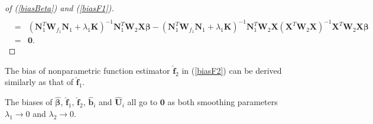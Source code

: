 \documentclass[article,lineno]{biometrika}
\begin{document}
\begin{proof} [of (\ref{biasBeta}) and (\ref{biasF1})]
\begin{eqnarray*}
  \\
  &=&
(\boldsymbol N_1^T \boldsymbol W_{f_1}  \boldsymbol N_1
  + \lambda_1 \boldsymbol K)^{-1}  \boldsymbol N_1^T
\boldsymbol W_2
\boldsymbol X \boldsymbol \beta 
 -   (\boldsymbol N_1^T \boldsymbol W_{f_1}  \boldsymbol N_1
  + \lambda_1 \boldsymbol K)^{-1}  \boldsymbol N_1^T
\boldsymbol W_2 \boldsymbol X
(\boldsymbol X^T  \boldsymbol W_2\boldsymbol X)^{-1}  
\boldsymbol X^T  \boldsymbol W_2 \boldsymbol X
\boldsymbol \beta  \\
  &=&   \boldsymbol 0.
\end{eqnarray*}
\end{proof}
\begin{remark}
The bias of nonparametric function estimator $\bm {\hat f}_2$ in (\ref{biasF2}) can be derived similarly as that of $\bm {\hat f}_1$.
\end{remark}


%
%
\begin{lemma}
The biases of $\boldsymbol {\hat \beta}$, $\boldsymbol {\hat f}_1$, $\boldsymbol {\hat f}_2$, $\boldsymbol {\hat b}_i$ and $\boldsymbol {\hat U}_i$ all go to $\boldsymbol 0$ as both smoothing parameters $\lambda_1 \to 0$ and $\lambda_2 \to 0$.
\end{lemma}
\end{document}
